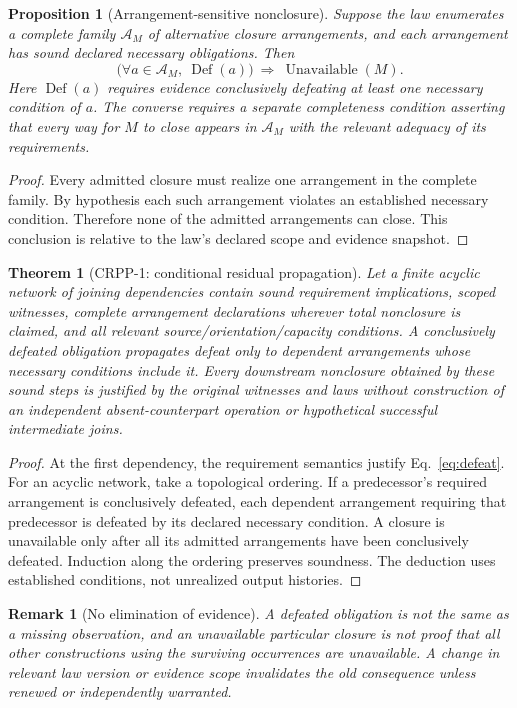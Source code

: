 \documentclass[11pt]{article}
\newtheorem{proposition}[definition]{Proposition}
\newtheorem{theorem}[definition]{Theorem}
\newtheorem{remark}[definition]{Remark}
\newcommand{\Def}{\operatorname{Def}}
\begin{document}
\begin{proposition}[Arrangement-sensitive nonclosure]
Suppose the law enumerates a \emph{complete} family $\mathcal A_M$
of alternative closure arrangements, and each arrangement has sound
declared necessary obligations. Then
\[
 \bigl(\forall a\in\mathcal A_M,\ \Def(a)\bigr)
 \ \Longrightarrow\ \operatorname{Unavailable}(M).
\]
Here $\Def(a)$ requires evidence conclusively defeating at least one
necessary condition of $a$. The converse requires a separate completeness
condition asserting that every way for $M$ to close appears in
$\mathcal A_M$ with the relevant adequacy of its requirements.
\end{proposition}
\begin{proof}
Every admitted closure must realize one arrangement in the complete family.
By hypothesis each such arrangement violates an established necessary
condition. Therefore none of the admitted arrangements can close. This
conclusion is relative to the law's declared scope and evidence snapshot.
\end{proof}

\begin{theorem}[CRPP-1: conditional residual propagation]
Let a finite acyclic network of joining dependencies contain
sound requirement implications, scoped witnesses, complete arrangement
declarations wherever total nonclosure is claimed, and all relevant
source/orientation/capacity conditions. A conclusively defeated
obligation propagates defeat only to dependent arrangements whose
necessary conditions include it. Every downstream nonclosure obtained
by these sound steps is justified by the original witnesses and laws
without construction of an independent absent-counterpart operation
or hypothetical successful intermediate joins.
\end{theorem}
\begin{proof}
At the first dependency, the requirement semantics justify
Eq.~\eqref{eq:defeat}. For an acyclic network, take a topological
ordering. If a predecessor's required arrangement is conclusively
defeated, each dependent arrangement requiring that predecessor is
defeated by its declared necessary condition. A closure is unavailable
only after all its admitted arrangements have been conclusively
defeated. Induction along the ordering preserves soundness.
The deduction uses established conditions, not unrealized output
histories.
\end{proof}

\begin{remark}[No elimination of evidence]
A defeated obligation is not the same as a missing observation,
and an unavailable \emph{particular} closure is not proof that all
other constructions using the surviving occurrences are unavailable.
A change in relevant law version or evidence scope invalidates the
old consequence unless renewed or independently warranted.
\end{remark}
\end{document}
